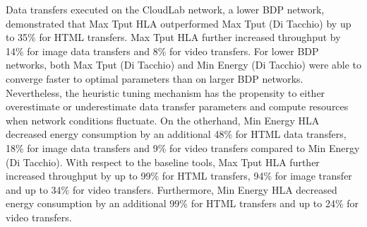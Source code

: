 \documentclass[conference]{IEEEtran}
\begin{document}
Data transfers executed on the CloudLab network, a lower BDP network, demonstrated that Max Tput HLA outperformed Max Tput (Di Tacchio) by up to 35\% for HTML transfers. Max Tput HLA further increased throughput by 14\% for image data transfers and 8\% for video transfers. For lower BDP networks, both Max Tput (Di Tacchio) and Min Energy (Di Tacchio) were able to converge faster to optimal parameters than on larger BDP networks. Nevertheless, the heuristic tuning mechanism has the propensity to either overestimate or underestimate data transfer parameters and compute resources when network conditions fluctuate. On the otherhand, Min Energy HLA decreased energy consumption by an additional 48\% for HTML data transfers, 18\% for image data transfers and 9\% for video transfers compared to Min Energy (Di Tacchio). With respect to the baseline tools, Max Tput HLA further increased throughput by up to 99\% for HTML transfers, 94\% for image transfer and up to 34\% for video transfers. Furthermore, Min Energy HLA decreased energy consumption by an additional 99\% for HTML transfers and up to 24\% for video transfers. 
\end{document}
